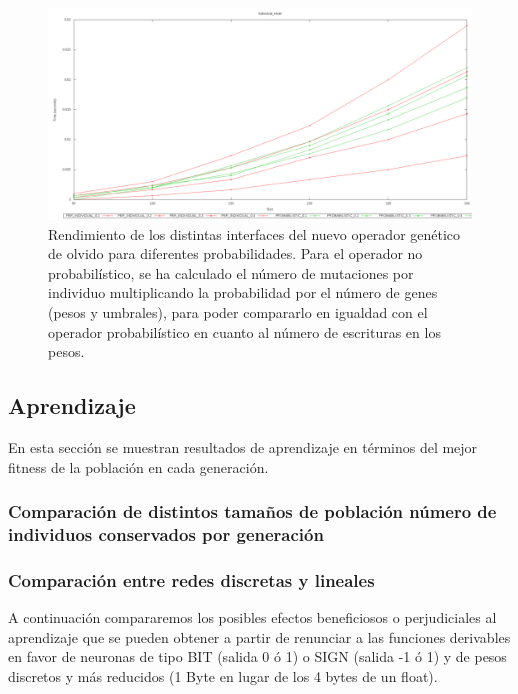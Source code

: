 \documentclass[11pt]{article}
\begin{document}
\begin{titlepage}
\begin{figure}[htb]
\centering
\includegraphics[width=\textwidth]{./img/Individual_reset.png}
\caption{\label{rendGenOlvido}Rendimiento de los distintas interfaces del nuevo operador genético de olvido para diferentes probabilidades. Para el operador no probabilístico, se ha calculado el número de mutaciones por individuo multiplicando la probabilidad por el número de genes (pesos y umbrales), para poder compararlo en igualdad con el operador probabilístico en cuanto al número de escrituras en los pesos.}
\end{figure}
\newpage
\subsection{Aprendizaje}
\label{sec-6-2}

  \label{aprendizaje}

En esta sección se muestran resultados de aprendizaje en términos del mejor fitness de la población en cada generación.
\subsubsection{Comparación de distintos tamaños de población número de individuos conservados por generación}
\label{sec-6-2-1}


\newpage
\subsubsection{Comparaci\'on entre redes discretas y lineales}
\label{sec-6-2-2}

   \label{}

A continuación compararemos los posibles efectos beneficiosos o perjudiciales al aprendizaje que se pueden obtener a partir de renunciar a las funciones derivables en favor de neuronas de tipo BIT (salida 0 ó 1)  o SIGN (salida -1 ó 1) y de pesos discretos y más reducidos (1 Byte en lugar de los 4 bytes de un float).

\end{titlepage}
\end{document}
